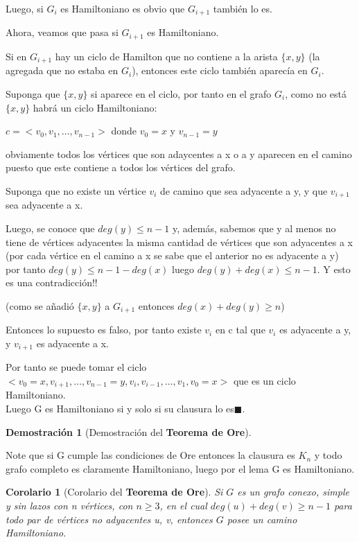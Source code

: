 \documentclass[a4paper,1pt]{report}
\newtheorem*{cor}{Corolario}
\newtheorem*{dem}{Demostración}
\begin{document}
Luego, si $G_i$ es Hamiltoniano es obvio que $G_{i+1}$ también lo es.

Ahora, veamos que pasa si $G_{i+1}$ es Hamiltoniano.

Si en $G_{i+1}$ hay un ciclo de Hamilton que no contiene a la arista $\{x,y\}$ (la agregada que no estaba en $G_i$), entonces este ciclo también aparecía en $G_i$.

Suponga que $\{x,y\}$ si aparece en el ciclo, por tanto en el grafo $G_i$, como no está $\{x,y\}$ habrá un ciclo Hamiltoniano: 

$c=<v_0,v_1,\dots,v_{n-1}>$ donde $v_0=x$ y $v_{n-1}=y$

obviamente todos los vértices que son adaycentes a x o a y aparecen en el camino puesto que este contiene a todos los vértices del grafo.

Suponga que no existe un vértice $v_i$ de camino que sea adyacente a y, y que $v_{i+1}$ sea adyacente a x. 

Luego, se conoce que $deg(y)\leq n-1$ y, además, sabemos que y al menos no tiene de vértices adyacentes la misma cantidad de vértices que son adyacentes a x (por cada vértice en el camino a x se sabe que el anterior no es adyacente a y) por tanto $deg(y)\leq n-1 - deg(x)$ luego $deg(y) + deg(x)\leq n-1 $. Y esto es una contradicción!! 

(como se añadió $\{x,y\}$  a $G_{i+1}$ entonces $deg(x)+deg(y)\geq n$)

Entonces lo supuesto es falso, por tanto existe $v_i$ en c tal que $v_i$ es adyacente a y, y $v_{i+1}$ es adyacente a x. 

Por tanto se puede tomar el ciclo $<v_0=x,v_{i+1},\dots,v_{n-1}=y,v_i,v_{i-1},\dots,v_1,v_0=x>$ que es un ciclo Hamiltoniano.\\

Luego G es Hamiltoniano si y solo si su clausura lo es$\blacksquare$.

\begin{dem}[Demostración del \textbf{Teorema de Ore}]
 
\end{dem}

Note que si G cumple las condiciones de Ore entonces la clausura es $K_n$ y todo grafo completo es claramente Hamiltoniano, luego por el lema G es Hamiltoniano.
  
\begin{cor}[Corolario del \textbf{Teorema de Ore}]
  Si $G$ es un grafo conexo, simple y sin lazos con n vértices, con $n\geq 3$, en el cual $deg(u)+deg(v)\geq n - 1$ para todo par de vértices no adyacentes u, v, entonces $G$ posee un camino Hamiltoniano.
\end{cor}
\end{document}
